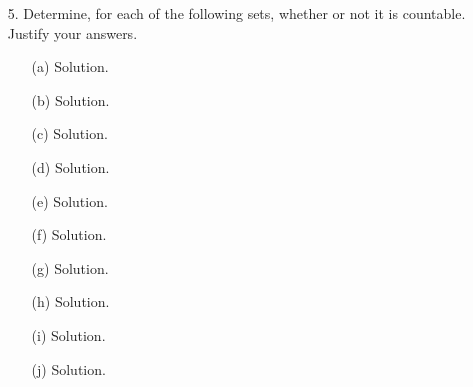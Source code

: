 \documentclass[12pt, a4paper]{article}
\begin{document}
\begin{itemize}
\item[]

\item[5.]
Determine, for each of the following sets, whether or not it is countable. Justify
your answers.
\begin{itemize}
\item[(a)]
Solution.

\item[(b)]
Solution.

\item[(c)]
Solution.

\item[(d)]
Solution.

\item[(e)]
Solution.

\item[(f)]
Solution.

\item[(g)]
Solution.

\item[(h)]
Solution.

\item[(i)]
Solution.

\item[(j)]
Solution.
\end{itemize}

\end{itemize}
\end{document}
